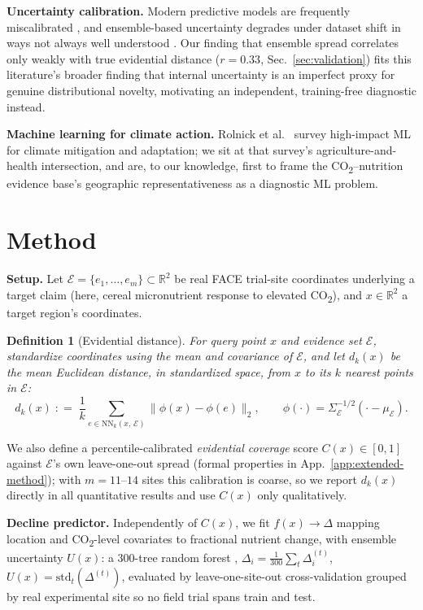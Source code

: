 \documentclass{article}
\newtheorem{definition}{Definition}
\newcommand{\eqdef}{\mathrel{\mathop:}=}
\begin{document}
\textbf{Uncertainty calibration.} Modern predictive models are frequently miscalibrated \citep{guo2017calibration}, and ensemble-based uncertainty \citep{lakshminarayanan2017simple} degrades under dataset shift in ways not always well understood \citep{ovadia2019trust}. Our finding that ensemble spread correlates only weakly with true evidential distance ($r=0.33$, Sec.~\ref{sec:validation}) fits this literature's broader finding that internal uncertainty is an imperfect proxy for genuine distributional novelty, motivating an independent, training-free diagnostic instead.

\textbf{Machine learning for climate action.} Rolnick et al.\ \citep{rolnick2022tackling} survey high-impact ML for climate mitigation and adaptation; we sit at that survey's agriculture-and-health intersection, and are, to our knowledge, first to frame the CO\textsubscript{2}--nutrition evidence base's geographic representativeness as a diagnostic ML problem.

\section{Method}

\textbf{Setup.} Let $\mathcal{E} = \{e_1, \ldots, e_m\} \subset \mathbb{R}^2$ be real FACE trial-site coordinates underlying a target claim (here, cereal micronutrient response to elevated CO\textsubscript{2}), and $x \in \mathbb{R}^2$ a target region's coordinates.

\begin{definition}[Evidential distance]
For query point $x$ and evidence set $\mathcal{E}$, standardize coordinates using the mean and covariance of $\mathcal{E}$, and let $d_k(x)$ be the mean Euclidean distance, in standardized space, from $x$ to its $k$ nearest points in $\mathcal{E}$:
\[
d_k(x) \;\eqdef\; \frac{1}{k}\sum_{e \in \mathrm{NN}_k(x,\, \mathcal{E})} \lVert \phi(x) - \phi(e) \rVert_2, \qquad \phi(\cdot) = \Sigma_\mathcal{E}^{-1/2}(\cdot - \mu_\mathcal{E}).
\]
\end{definition}

We also define a percentile-calibrated \emph{evidential coverage} score $C(x) \in [0,1]$ against $\mathcal{E}$'s own leave-one-out spread (formal properties in App.~\ref{app:extended-method}); with $m=11$--$14$ sites this calibration is coarse, so we report $d_k(x)$ directly in all quantitative results and use $C(x)$ only qualitatively.

\textbf{Decline predictor.} Independently of $C(x)$, we fit $f(x) \to \Delta$ mapping location and CO\textsubscript{2}-level covariates to fractional nutrient change, with ensemble uncertainty $U(x)$: a 300-tree random forest \citep{breiman2001random}, $\Delta_i = \frac{1}{300}\sum_t \Delta_i^{(t)}$, $U(x) = \mathrm{std}_t(\Delta^{(t)})$, evaluated by leave-one-site-out cross-validation grouped by real experimental site so no field trial spans train and test.
\end{document}
